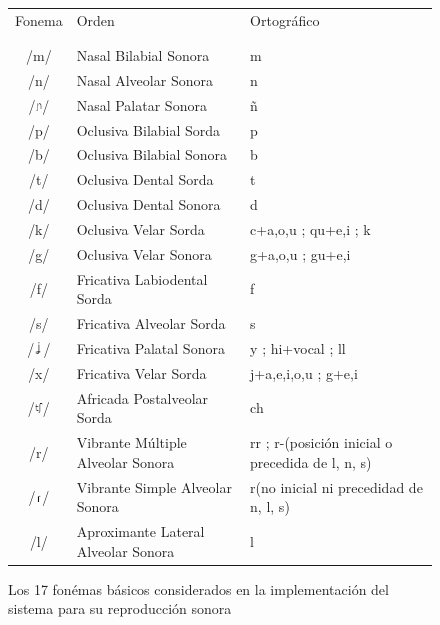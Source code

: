 \begin{figure}[!h]
	\centering
	\begin{tabular}{c | p{5.5cm} | p{4.5cm}}
		Fonema 	& \hfil Orden \hfil 						& \hfil Ortográfico \hfil \\
				&								& \\ \hline
				&								& \\
		/m/		& Nasal Bilabial Sonora				& m \\
		/n/		& Nasal Alveolar Sonora				& n \\
		/\includegraphics[width=5pt]{Imagenes/nasal_palatal.png}/		& Nasal Palatar Sonora				& ñ \\
		/p/		& Oclusiva Bilabial Sorda			& p \\
		/b/		& Oclusiva Bilabial Sonora			& b \\
		/t/		& Oclusiva Dental Sorda				& t \\
		/d/		& Oclusiva Dental Sonora			& d \\
		/k/		& Oclusiva Velar Sorda				& c+a,o,u ; qu+e,i ; k \\
		/g/		& Oclusiva Velar Sonora				& g+a,o,u ; gu+e,i \\
		/f/		& Fricativa Labiodental Sorda		& f \\
		/s/		& Fricativa Alveolar Sorda			& s \\
		/\includegraphics[width=7pt]{Imagenes/fricativa_palatal_sonora.png}/		& Fricativa Palatal Sonora			& y ; hi+vocal ; ll \\
		/x/		& Fricativa Velar Sorda				& j+a,e,i,o,u ; g+e,i \\
		/\includegraphics[width=6pt]{Imagenes/africada_postalveolar_sorda.png}/		& Africada Postalveolar Sorda		& ch \\
		/r/		& Vibrante Múltiple Alveolar Sonora	& rr ; r-(posición inicial o precedida de l, n, s) \\
		/\includegraphics[width=5pt]{Imagenes/vibrante_alveolar_simple.png}/		& Vibrante Simple Alveolar Sonora	& r(no inicial ni precedidad de n, l, s) \\
		/l/		& Aproximante Lateral Alveolar Sonora& l
	\end{tabular}
	\label{Tabla_fonemas}
	\caption{Los 17 fonémas básicos considerados en la implementación del sistema para su reproducción sonora}
\end{figure}

